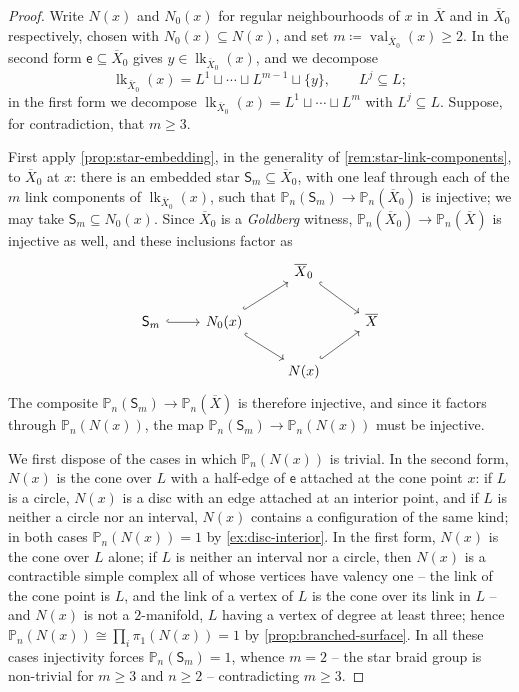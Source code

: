 \documentclass[reqno]{amsart}
\theoremstyle{definition}
\newcommand\sfS{\mathsf{S}}
\newcommand\sfe{\mathsf{e}}
\newcommand{\PB}{\mathbb{P}}
\renewcommand{\bar}{\overline}
\DeclareMathOperator{\lk}{lk}
\DeclareMathOperator{\val}{val}
\numberwithin{equation}{section}
\begin{document}
\begin{proof}
Write \(N(x)\) and \(N_0(x)\) for regular neighbourhoods of
\(x\) in \(\bar X\) and in \(\bar X_0\) respectively, chosen with
\(N_0(x)\subseteq N(x)\), and set
\(m\coloneqq\val_{\bar X_0}(x)\geq2\). In the second form
\(\sfe\subseteq\bar X_0\) gives \(y\in\lk_{\bar X_0}(x)\), and we
decompose
\[
\lk_{\bar X_0}(x)=L^{1}\sqcup\cdots\sqcup
L^{m-1}\sqcup\{y\},
\qquad L^{j}\subseteq L;
\]
in the first form we decompose
\(\lk_{\bar X_0}(x)=L^{1}\sqcup\cdots\sqcup L^{m}\) with
\(L^{j}\subseteq L\). Suppose, for contradiction, that
\(m\geq3\).

First apply \cref{prop:star-embedding}, in the generality of
\cref{rem:star-link-components}, to \(\bar X_0\) at \(x\): there
is an embedded star \(\sfS_m\subseteq\bar X_0\), with one leaf
through each of the \(m\) link components of
\(\lk_{\bar X_0}(x)\), such that
\(\PB_n(\sfS_m)\to\PB_n(\bar X_0)\) is injective; we may take
\(\sfS_m\subseteq N_0(x)\). Since \(\bar X_0\) is a
\emph{Goldberg} witness, \(\PB_n(\bar X_0)\to\PB_n(\bar X)\) is
injective as well, and these inclusions factor as
\[
\begin{tikzcd}
& & \bar X_0 \ar[rd,hookrightarrow]\\
\sfS_m\ar[r,hookrightarrow] & N_0(x) \ar[ru,hookrightarrow]\ar[rd,hookrightarrow] & & \bar X\\
& & N(x)\ar[ru,hookrightarrow]
\end{tikzcd}
\]
The composite \(\PB_n(\sfS_m)\to\PB_n(\bar X)\) is therefore
injective, and since it factors through \(\PB_n(N(x))\), the map
\(\PB_n(\sfS_m)\to\PB_n(N(x))\) must be injective.

We first dispose of the cases in which \(\PB_n(N(x))\) is
trivial. In the second form, \(N(x)\) is the cone over \(L\) with
a half-edge of \(\sfe\) attached at the cone point \(x\): if \(L\)
is a circle, \(N(x)\) is a disc with an edge attached at an
interior point, and if \(L\) is neither a circle nor an interval,
\(N(x)\) contains a configuration of the same kind; in both cases
\(\PB_n(N(x))=1\) by \cref{ex:disc-interior}. In the first form,
\(N(x)\) is the cone over \(L\) alone; if \(L\) is neither an
interval nor a circle, then \(N(x)\) is a contractible simple
complex all of whose vertices have valency one -- the link of the
cone point is \(L\), and the link of a vertex of \(L\) is the
cone over its link in \(L\) -- and \(N(x)\) is not a
\(2\)-manifold, \(L\) having a vertex of degree at least three;
hence \(\PB_n(N(x))\cong\prod_{i}\pi_1(N(x))=1\) by
\cref{prop:branched-surface}. In all these cases injectivity
forces \(\PB_n(\sfS_m)=1\), whence \(m=2\) -- the star braid
group is non-trivial for \(m\geq3\) and \(n\geq2\) --
contradicting \(m\geq3\).


\end{proof}
\end{document}
